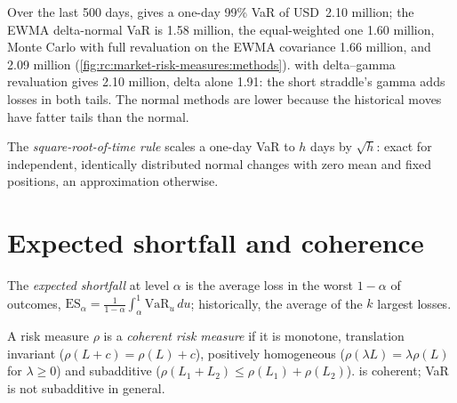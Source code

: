\begin{example}\label{ex:rc:market-risk-measures:methods}
Over the last 500 days,  gives a one-day 99\% VaR of USD~2.10 million;
the EWMA delta-normal VaR is 1.58 million, the equal-weighted one 1.60 million, Monte Carlo
with full revaluation on the EWMA covariance 1.66 million, and 
2.09 million (\cref{fig:rc:market-risk-measures:methods}).  with
delta--gamma revaluation gives 2.10 million, delta alone 1.91: the short straddle's gamma adds
losses in both tails. The normal methods are lower because the historical moves have fatter
tails than the normal.
\end{example}

\label{lst:rc:market-risk-measures:var}

\begin{definition}\label{def:rc:market-risk-measures:sqrt}
The \emph{square-root-of-time rule} scales a one-day VaR to $h$
days by $\sqrt h$: exact for independent, identically distributed normal changes with zero
mean and fixed positions, an approximation otherwise.
\end{definition}

\section{Expected shortfall and coherence}

\begin{definition}\label{def:rc:market-risk-measures:es}
The \emph{expected shortfall} at level $\alpha$ is the average loss in the
worst $1-\alpha$ of outcomes, $\mathrm{ES}_\alpha = \frac1{1-\alpha}\int_\alpha^1\mathrm{VaR}_u\,du$; historically, the average of
the $k$ largest losses.
\end{definition}

\begin{definition}\label{def:rc:market-risk-measures:coherent}
A risk measure $\rho$ is a \emph{coherent risk measure} if it is
monotone, translation invariant ($\rho(L+c) = \rho(L)+c$), positively homogeneous ($\rho(\lambda L) = \lambda\rho(L)$
for $\lambda\ge0$) and subadditive ($\rho(L_1+L_2)\le\rho(L_1)+\rho(L_2)$).  is coherent;
VaR is not subadditive in general.
\end{definition}


